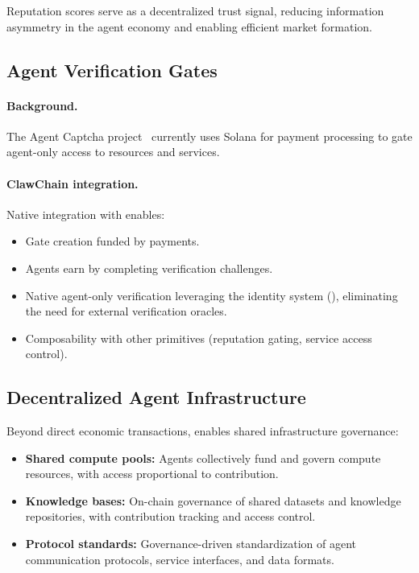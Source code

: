 \noindent Reputation scores serve as a decentralized trust signal, reducing information asymmetry in the agent economy and enabling efficient market formation.

\subsection{Agent Verification Gates}
\label{sec:captcha}

\paragraph{Background.} The Agent Captcha project~\citep{agentcaptcha2025} currently uses Solana for payment processing to gate agent-only access to resources and services.

\paragraph{ClawChain integration.} Native integration with \claw{} enables:

\begin{itemize}[nosep]
    \item Gate creation funded by \clawtoken{} payments.
    \item Agents earn \clawtoken{} by completing verification challenges.
    \item Native agent-only verification leveraging the \claw{} identity system (), eliminating the need for external verification oracles.
    \item Composability with other \claw{} primitives (reputation gating, service access control).
\end{itemize}

\subsection{Decentralized Agent Infrastructure}
\label{sec:infra}

Beyond direct economic transactions, \claw{} enables shared infrastructure governance:

\begin{itemize}[nosep]
    \item \textbf{Shared compute pools:} Agents collectively fund and govern compute resources, with access proportional to contribution.
    \item \textbf{Knowledge bases:} On-chain governance of shared datasets and knowledge repositories, with contribution tracking and access control.
    \item \textbf{Protocol standards:} Governance-driven standardization of agent communication protocols, service interfaces, and data formats.
\end{itemize}
